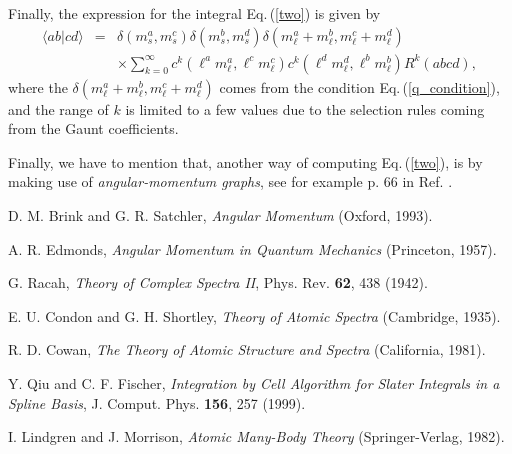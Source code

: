 \documentclass[]{interact}
\def\refe#1{{\color{blue}\textsf{Eq.}\,(\ref{#1})}}
\renewcommand{\l}{\ell}
\begin{document}
Finally, the expression for the integral \refe{two} is given by
\begin{equation}
\begin{array}{rcl}
  \langle ab|cd \rangle &=& \delta(m_s^a,m_s^c)\delta(m_s^b,m_s^d) \delta(m_\l^a+{m_\l^b},{m_\l^c}+{m_\l^d})\\
  &&\times\sum_{k=0}^\infty c^k({\l^a}{m_\l^a},{\l^c}{m_\l^c})c^k({\l^d}{m_\l^d},{\l^b}{m_\l^b})R^k(abcd),
\end{array}
\end{equation}
where the $\delta(m_\l^a+{m_\l^b},{m_\l^c}+{m_\l^d})$ comes from the condition \refe{q_condition}, and the range of $k$ is limited to a few values due to the selection rules coming from the Gaunt coefficients. 


Finally, we have to mention that, another way of computing \refe{two}, is by making use of  \emph{angular-momentum graphs}, see for example p. 66 in Ref. \cite{Lindgren}.























\begingroup
\vspace{-0.25cm}
\small
\begin{thebibliography}{1}
\vspace{-0.25cm}

{}  D. M. Brink and G. R. Satchler, \emph{Angular Momentum} (Oxford, 1993). 


 A. R. Edmonds, \emph{Angular Momentum in Quantum Mechanics} (Princeton, 1957).  

   G. Racah, \emph{Theory of Complex Spectra II}, Phys. Rev. {\bf 62}, 438 (1942).

  E. U. Condon and G. H. Shortley, \emph{Theory of Atomic Spectra} (Cambridge, 1935). 

 R. D. Cowan, \emph{The Theory of Atomic Structure and Spectra} (California, 1981).

 Y. Qiu and C. F. Fischer, \emph{Integration by Cell Algorithm for Slater Integrals in a Spline Basis}, J. Comput. Phys. {\bf 156}, 257 (1999).

 I. Lindgren and J. Morrison, \emph{Atomic Many-Body Theory} (Springer-Verlag, 1982).

\end{thebibliography}
\endgroup
\end{document}
